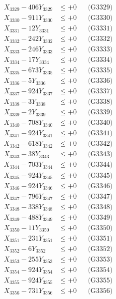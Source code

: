 \documentclass[a4paper,10pt]{article}
\begin{document}
{\begin{align}
X_{3329} - 406Y_{3329} &\leq +0 && \text{(G3329)} \\
X_{3330} - 911Y_{3330} &\leq +0 && \text{(G3330)} \\
\allowbreak
X_{3331} - 12Y_{3331} &\leq +0 && \text{(G3331)} \\
X_{3332} - 242Y_{3332} &\leq +0 && \text{(G3332)} \\
X_{3333} - 246Y_{3333} &\leq +0 && \text{(G3333)} \\
X_{3334} - 17Y_{3334} &\leq +0 && \text{(G3334)} \\
X_{3335} - 673Y_{3335} &\leq +0 && \text{(G3335)} \\
X_{3336} - 5Y_{3336} &\leq +0 && \text{(G3336)} \\
X_{3337} - 924Y_{3337} &\leq +0 && \text{(G3337)} \\
X_{3338} - 3Y_{3338} &\leq +0 && \text{(G3338)} \\
X_{3339} - 2Y_{3339} &\leq +0 && \text{(G3339)} \\
X_{3340} - 708Y_{3340} &\leq +0 && \text{(G3340)} \\
\allowbreak
X_{3341} - 924Y_{3341} &\leq +0 && \text{(G3341)} \\
X_{3342} - 618Y_{3342} &\leq +0 && \text{(G3342)} \\
X_{3343} - 38Y_{3343} &\leq +0 && \text{(G3343)} \\
X_{3344} - 703Y_{3344} &\leq +0 && \text{(G3344)} \\
X_{3345} - 924Y_{3345} &\leq +0 && \text{(G3345)} \\
X_{3346} - 924Y_{3346} &\leq +0 && \text{(G3346)} \\
X_{3347} - 796Y_{3347} &\leq +0 && \text{(G3347)} \\
X_{3348} - 338Y_{3348} &\leq +0 && \text{(G3348)} \\
X_{3349} - 488Y_{3349} &\leq +0 && \text{(G3349)} \\
X_{3350} - 11Y_{3350} &\leq +0 && \text{(G3350)} \\
\allowbreak
X_{3351} - 231Y_{3351} &\leq +0 && \text{(G3351)} \\
X_{3352} - 6Y_{3352} &\leq +0 && \text{(G3352)} \\
X_{3353} - 255Y_{3353} &\leq +0 && \text{(G3353)} \\
X_{3354} - 924Y_{3354} &\leq +0 && \text{(G3354)} \\
X_{3355} - 924Y_{3355} &\leq +0 && \text{(G3355)} \\
X_{3356} - 731Y_{3356} &\leq +0 && \text{(G3356)} \\

\end{align}}
\end{document}

